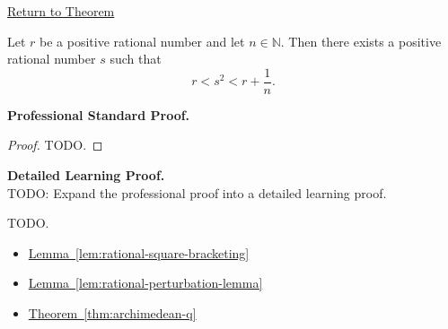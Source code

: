 \newpage
{}
\label{prf:rational-square-approximation-from-above}

\begin{remark*}[Return]
\hyperref[thm:rational-square-approximation-from-above]{Return to Theorem}
\end{remark*}

\begin{theorem*}
Let $r$ be a positive rational number and let $n\in\mathbb{N}$. Then there
exists a positive rational number $s$ such that
\[
r<s^2<r+\frac{1}{n}.
\]
\end{theorem*}

\textbf{Professional Standard Proof.}~\\
\begin{proof}
TODO.
\end{proof}

\textbf{Detailed Learning Proof.}~\\
TODO: Expand the professional proof into a detailed learning proof.


\begin{remark*}
TODO.
\end{remark*}

\begin{dependencies}
\begin{itemize}
  \item \hyperref[lem:rational-square-bracketing]{Lemma~\ref*{lem:rational-square-bracketing}}
  \item \hyperref[lem:rational-perturbation-lemma]{Lemma~\ref*{lem:rational-perturbation-lemma}}
  \item \hyperref[thm:archimedean-q]{Theorem~\ref*{thm:archimedean-q}}
\end{itemize}
\end{dependencies}
